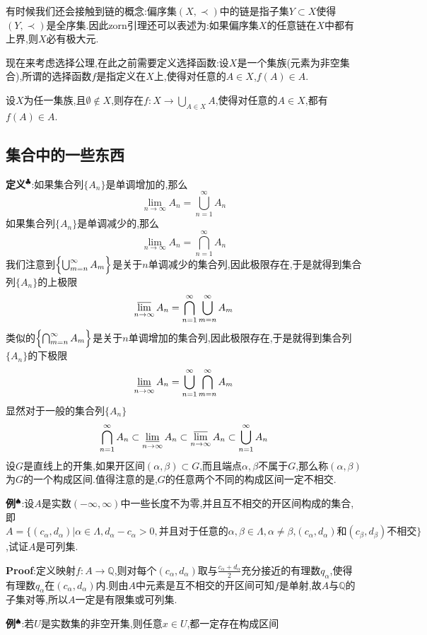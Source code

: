 有时候我们还会接触到链的概念:偏序集$(X,\prec)$中的链是指子集$Y\subset X$使得$(Y,\prec)$是全序集.因此zorn引理还可以表述为:如果偏序集$X$的任意链在$X$中都有上界,则$X$必有极大元.\par
现在来考虑选择公理,在此之前需要定义选择函数:设$X$是一个集族(元素为非空集合),所谓的选择函数$f$是指定义在$X$上,使得对任意的$A\in X$,$f(A)\in A$.
\begin{tcolorbox}[colback=KuangNei,colframe=BianKuang,title=\textbf{选择公理},sharpish corners]
    设$X$为任一集族,且$\emptyset\notin X$,则存在$f:X\to \bigcup_{A\in X}A$,使得对任意的$A\in X$,都有$f(A)\in A$.
\end{tcolorbox}
\subsection{集合中的一些东西}
\textbf{定义}$^\clubsuit $:如果集合列$\{A_n\}$是单调增加的,那么
$$
\lim_{n\to \infty}A_n=\bigcup_{n=1}^{\infty}A_n
$$
\qquad 如果集合列$\{A_n\}$是单调减少的,那么
$$
\lim_{n\to \infty}A_n=\bigcap_{n=1}^{\infty}A_n
$$
\qquad 我们注意到$\Bigl\{\bigcup_{m=n}^{\infty}A_m\Bigr\}$是关于$n$单调减少的集合列,因此极限存在,于是就得到集合列$\{A_n\}$的上极限
$$
\varlimsup_{n\to\infty}A_n=\bigcap_{n=1}^{\infty}\bigcup_{m=n}^{\infty}A_m
$$
\qquad 类似的$\Bigl\{\bigcap_{m=n}^{\infty}A_m\Bigr\}$是关于$n$单调增加的集合列,因此极限存在,于是就得到集合列$\{A_n\}$的下极限
$$
\varliminf_{n\to\infty}A_n=\bigcup_{n=1}^{\infty}\bigcap_{m=n}^{\infty}A_m
$$
显然对于一般的集合列$\{A_n\}$
$$
\bigcap_{n=1}^{\infty}A_n\subset \varliminf_{n\to\infty}A_n\subset \varlimsup_{n\to\infty}A_n\subset \bigcup_{n=1}^{\infty}A_n
$$
\qquad 设$G$是直线上的开集,如果开区间$(\alpha,\beta)\subset G$,而且端点$\alpha,\beta$不属于$G$,那么称$(\alpha,\beta)$为$G$的一个构成区间.值得注意的是,$G$的任意两个不同的构成区间一定不相交.\par
\textbf{例}$^\spadesuit $:设$A$是实数$(-\infty,\infty)$中一些长度不为零,并且互不相交的开区间构成的集合,即$A=\{(c_\alpha,d_\alpha)|\alpha\in \varLambda ,d_\alpha-c_\alpha>0,\text{并且对于任意的$\alpha,\beta\in \varLambda,\alpha\neq\beta$,$(c_\alpha,d_\alpha)$和$(c_\beta,d_\beta)$不相交}\}$,试证$A$是可列集.\par
\textbf{Proof}:定义映射$f:A\to \mathbb{Q}$,则对每个$(c_\alpha,d_\alpha)$取与$\frac{c_\alpha+d_\alpha}{2}$充分接近的有理数$q_\alpha$,使得有理数$q_\alpha$在$(c_\alpha,d_\alpha)$内.则由$A$中元素是互不相交的开区间可知$f$是单射,故$A$与$\mathbb{Q}$的子集对等,所以$A$一定是有限集或可列集.\par
\textbf{例}$^\spadesuit $:若$U$是实数集的非空开集,则任意$x\in U$,都一定存在构成区间
